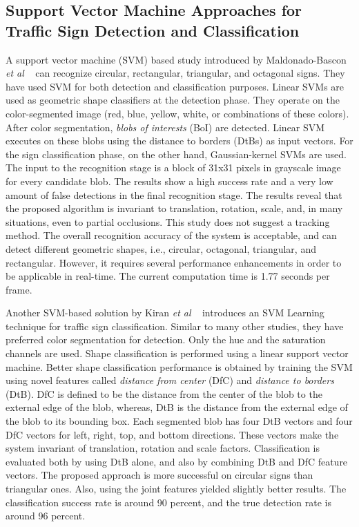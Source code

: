 \documentclass[review,number]{elsarticle}
\begin{document}
\subsection{Support Vector Machine Approaches for Traffic Sign Detection and Classification}
A support vector machine (SVM) based study introduced by Maldonado-Bascon \textit{et al} ~\cite{Maldonadobascon07} can recognize circular, rectangular, triangular, and octagonal signs. They have used SVM for both detection and classification purposes. Linear SVMs are used as geometric shape classifiers at the detection phase. They operate on the color-segmented image (red, blue, yellow, white, or combinations of these colors). After color segmentation, \emph{blobs of interests} (BoI) are detected. Linear SVM executes on these blobs using the distance to borders (DtBs) as input vectors. For the sign classification phase, on the other hand, Gaussian-kernel SVMs are used. The input to the recognition stage is a block of 31x31 pixels in grayscale image for every candidate blob. The results show a high success rate and a very low amount of false detections in the final recognition stage. The results reveal that the proposed algorithm is invariant to translation, rotation, scale, and, in many situations, even to partial occlusions. This study does not suggest a tracking method. The overall recognition accuracy of the system is acceptable, and can detect different geometric shapes, i.e., circular, octagonal, triangular, and rectangular. However, it requires several performance enhancements in order to be applicable in real-time. The current computation time is 1.77 seconds per frame.

Another SVM-based solution by Kiran \textit{et al} ~\cite{signbib07} introduces an SVM Learning technique for traffic sign classification. Similar to many other studies, they have preferred color segmentation for detection. Only the hue and the saturation channels are used. Shape classification is performed using a linear support vector machine. Better shape classification performance is obtained by training the SVM using novel features called \textit{distance from center} (DfC) and \textit{distance to borders} (DtB). DfC is defined to be the distance from the center of the blob to the external edge of the blob, whereas, DtB is the distance from the external edge of the blob to its bounding box. Each segmented blob has four DtB vectors and four DfC vectors for left, right, top, and bottom directions. These vectors make the system invariant of translation, rotation and scale factors. Classification is evaluated both by using DtB alone, and also by combining DtB and DfC feature vectors. The proposed approach is more successful on circular signs than triangular ones. Also, using the joint features yielded slightly better results. The classification success rate is around 90 percent, and the true detection rate is around 96 percent.
\end{document}
